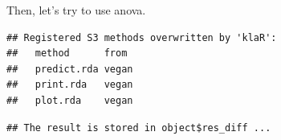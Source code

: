 \documentclass[
]{book}
\newenvironment{Shaded}{\begin{snugshade}}{\end{snugshade}}
\newcommand{\AttributeTok}[1]{\textcolor[rgb]{0.77,0.63,0.00}{#1}}
\newcommand{\CommentTok}[1]{\textcolor[rgb]{0.56,0.35,0.01}{\textit{#1}}}
\newcommand{\FunctionTok}[1]{\textcolor[rgb]{0.00,0.00,0.00}{#1}}
\newcommand{\NormalTok}[1]{#1}
\newcommand{\SpecialCharTok}[1]{\textcolor[rgb]{0.00,0.00,0.00}{#1}}
\newcommand{\StringTok}[1]{\textcolor[rgb]{0.31,0.60,0.02}{#1}}
\begin{document}
\begin{Shaded}
\end{Shaded}

Then, let's try to use anova.

\begin{Shaded}
\end{Shaded}

\begin{verbatim}
## Registered S3 methods overwritten by 'klaR':
##   method      from 
##   predict.rda vegan
##   print.rda   vegan
##   plot.rda    vegan
\end{verbatim}

\begin{verbatim}
## The result is stored in object$res_diff ...
\end{verbatim}
\end{document}
